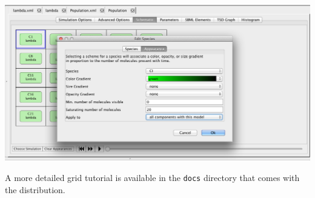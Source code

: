 \documentclass[titlepage,11pt]{article}
\begin{document}
\begin{center}
\includegraphics[width=160mm]{screenshots/compAppearances}
\end{center}


\noindent
A more detailed 
grid tutorial
is available in the {\tt docs} directory that comes with the distribution.
\end{document}
